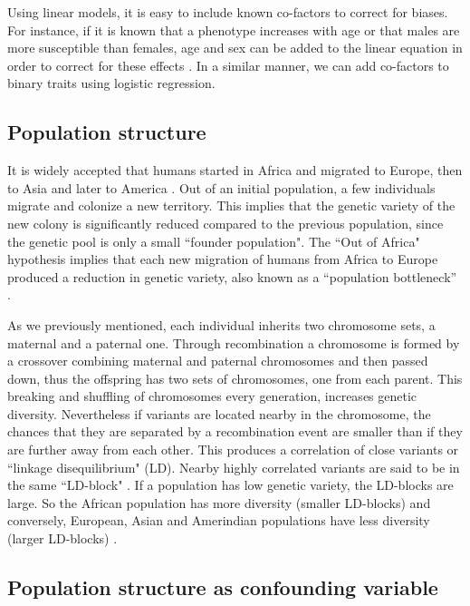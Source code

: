 Using linear models, it is easy to include known co-factors to correct for biases. 
For instance, if it is known that a phenotype increases with age or that males are more susceptible than females, age and sex can be added to the linear equation in order to correct for these effects \cite{balding2006tutorial,clarke2011basic}. 
In a similar manner, we can add co-factors to binary traits using logistic regression.

\subsection{Population structure \label{sec:popStruct}}

It is widely accepted that humans started in Africa and migrated to Europe, then to Asia and later to America \cite{hartl1997principles}. 
Out of an initial population, a few individuals migrate and colonize a new territory. 
This implies that the genetic variety of the new colony is significantly reduced compared to the previous population, since the genetic pool is only a small ``founder population". 
The ``Out of Africa" hypothesis implies that each new migration of humans from Africa to Europe produced a reduction in genetic variety, also known as a ``population bottleneck'' \cite{hartl1997principles}.

As we previously mentioned, each individual inherits two chromosome sets, a maternal and a paternal one. 
Through recombination a chromosome is formed by a crossover combining maternal and paternal chromosomes and then passed down, thus the offspring has two sets of chromosomes, one from each parent. 
This breaking and shuffling of chromosomes every generation, increases genetic diversity. Nevertheless if variants are located nearby in the chromosome, the chances that they are separated by a recombination event are smaller than if they are further away from each other. 
This produces a correlation of close variants or ``linkage disequilibrium" (LD). 
Nearby highly correlated variants are said to be in the same ``LD-block" \cite{hartl1997principles}. 
If a population has low genetic variety, the LD-blocks are large. 
So the African population has more diversity (smaller LD-blocks) and conversely, European, Asian and Amerindian populations have less diversity (larger LD-blocks) \cite{hartl1997principles}.

\subsection{Population structure as confounding variable }


